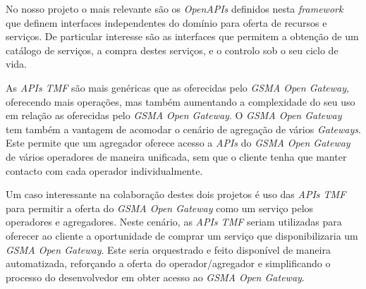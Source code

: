No nosso projeto o mais relevante são os \emph{OpenAPIs} definidos nesta
\emph{framework} que definem interfaces independentes do domínio para oferta de
recursos e serviços. De particular interesse são as interfaces que permitem a
obtenção de um catálogo de serviços, a compra destes serviços, e o controlo sob
o seu ciclo de vida.

As \emph{APIs TMF} são mais genéricas que as oferecidas pelo \emph{GSMA Open
	Gateway}, oferecendo mais operações, mas também aumentando a complexidade do
seu uso em relação as oferecidas pelo \emph{GSMA Open Gateway}. O \emph{GSMA
	Open Gateway} tem também a vantagem de acomodar o cenário de agregação de
vários \emph{Gateways}. Este permite que um agregador oferece acesso a
\emph{APIs} do \emph{GSMA Open Gateway} de vários operadores de maneira
unificada, sem que o cliente tenha que manter contacto com cada operador
individualmente.

Um caso interessante na colaboração destes dois projetos é uso das \emph{APIs
	TMF} para permitir a oferta do \emph{GSMA Open Gateway} como um serviço pelos
operadores e agregadores. Neste cenário, as \emph{APIs TMF} seriam utilizadas
para oferecer ao cliente a oportunidade de comprar um serviço que
disponibilizaria um \emph{GSMA Open Gateway}. Este seria orquestrado e feito
disponível de maneira automatizada, reforçando a oferta do operador/agregador e
simplificando o processo do desenvolvedor em obter acesso ao \emph{GSMA Open
	Gateway}.

